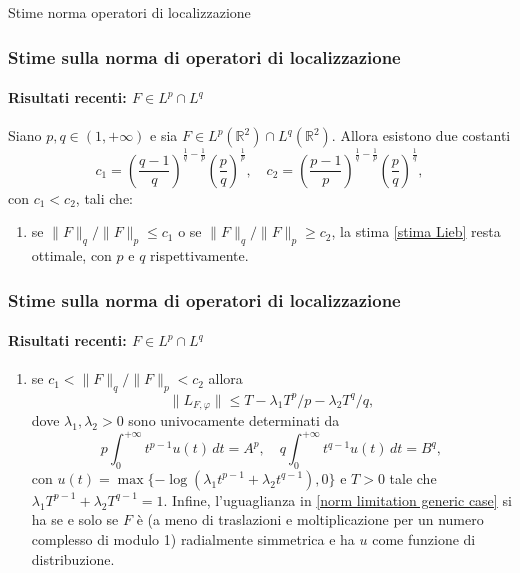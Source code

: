 \documentclass[aspectratio=141]{beamer}
\newcommand\setItemnumber[1]{\setcounter{enumi}{\numexpr#1-1\relax}}
\newcommand{\R}{\mathbb{R}} %
\begin{document}
\begin{section}{Stime norma operatori di localizzazione}
	\begin{frame}
		\frametitle{Stime sulla norma di operatori di localizzazione}
		\framesubtitle{Risultati recenti: $F \in L^p \cap L^q$}
		\begin{myblock}[Teorema]
			Siano $p,q \in (1,+\infty)$ e sia $F \in L^p(\R^2) \cap L^q(\R^2)$. Allora esistono due costanti
			\begin{equation*}
				c_1 = \left(\dfrac{q-1}{q}\right)^{\frac{1}{q}-\frac{1}{p}}\left(\dfrac{p}{q}\right)^{\frac{1}{p}}, \quad 
				c_2 = \left(\dfrac{p-1}{p}\right)^{\frac{1}{q}-\frac{1}{p}}\left(\dfrac{p}{q}\right)^{\frac{1}{q}},
			\end{equation*}
			con $c_1 < c_2$, tali che:
			\begin{enumerate}
				\item se $\|F\|_q / \|F\|_p \leq c_1$ o se $\|F\|_q / \|F\|_p \geq c_2$, la stima \eqref{stima Lieb} resta ottimale, con $p$ e $q$ rispettivamente.
			\end{enumerate}
		\end{myblock}
	\end{frame}
	
	\begin{frame}
		\frametitle{Stime sulla norma di operatori di localizzazione}
		\framesubtitle{Risultati recenti: $F \in L^p \cap L^q$}
		\begin{myblock}[Teorema]
			{
			\begin{enumerate}
				\setItemnumber{2}
				\item se $c_1 < \|F\|_q / \|F\|_p < c_2$ allora
				\begin{equation}\label{norm limitation generic case}
					\|L_{F,\varphi}\| \leq T - \lambda_1 T^p/p - \lambda_2 T^q/q,
				\end{equation}
				dove $\lambda_1, \lambda_2 > 0$ sono univocamente determinati da
				\begin{equation*}
					p \int_{0}^{+\infty} t^{p-1} u(t) \, dt = A^p, \quad q \int_{0}^{+\infty} t^{q-1} u(t) \, dt = B^q,
				\end{equation*}
				con $u(t) = \max\{-\log(\lambda_1 t^{p-1} + \lambda_2 t^{q-1}), 0\}$ e $T>0$ tale che $\lambda_1 T^{p-1} + \lambda_2 T^{q-1}=1$. Infine, l'uguaglianza in \eqref{norm limitation generic case} si ha se e solo se $F$ è (a meno di traslazioni e moltiplicazione per un numero complesso di modulo 1) radialmente simmetrica e ha $u$ come funzione di distribuzione.
			\end{enumerate}}
		\end{myblock}
	\end{frame}


\end{section}
\end{document}
